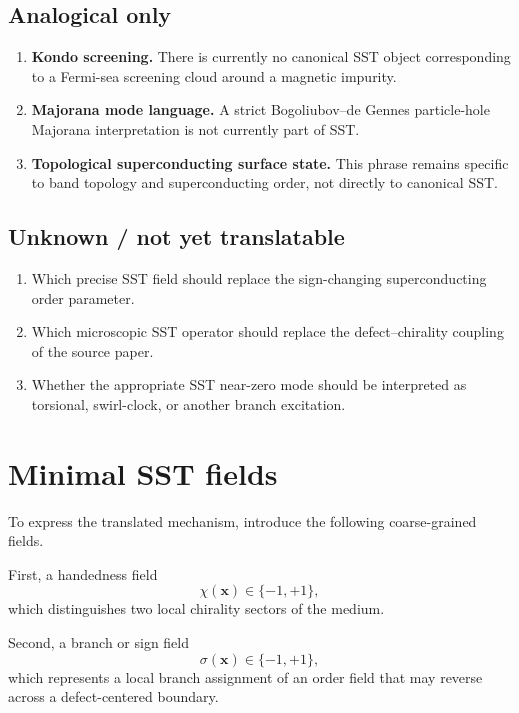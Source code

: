 \documentclass[11pt]{article}
\begin{document}
        \subsection{Analogical only}
            \begin{enumerate}[label=\arabic*.]
    \item \textbf{Kondo screening.} There is currently no canonical SST object corresponding to a Fermi-sea screening cloud around a magnetic impurity.
    \item \textbf{Majorana mode language.} A strict Bogoliubov--de Gennes particle-hole Majorana interpretation is not currently part of SST.
    \item \textbf{Topological superconducting surface state.} This phrase remains specific to band topology and superconducting order, not directly to canonical SST.
            \end{enumerate}

        \subsection{Unknown / not yet translatable}
            \begin{enumerate}[label=\arabic*.]
    \item Which precise SST field should replace the sign-changing superconducting order parameter.
    \item Which microscopic SST operator should replace the defect--chirality coupling of the source paper.
    \item Whether the appropriate SST near-zero mode should be interpreted as torsional, swirl-clock, or another branch excitation.
            \end{enumerate}

    \section{Minimal SST fields}
        To express the translated mechanism, introduce the following coarse-grained fields.

        First, a handedness field
        \begin{equation}
            \chi(\mathbf{x}) \in \{-1,+1\},
        \end{equation}
        which distinguishes two local chirality sectors of the medium.

        Second, a branch or sign field
        \begin{equation}
            \sigma(\mathbf{x}) \in \{-1,+1\},
        \end{equation}
        which represents a local branch assignment of an order field that may reverse across a defect-centered boundary.
\end{document}
